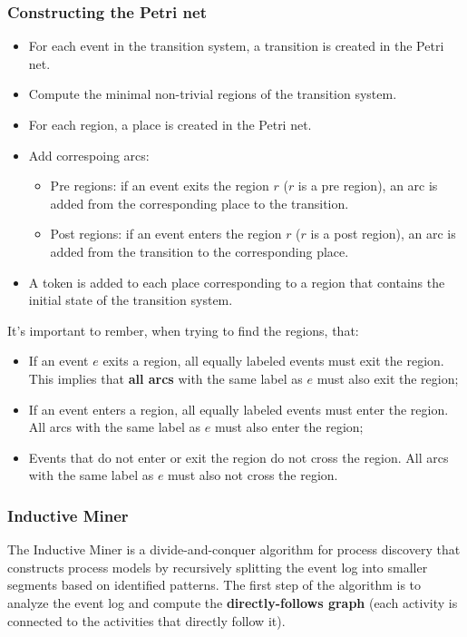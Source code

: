 \subsubsection*{Constructing the Petri net}
\begin{itemize}
    \item For each event in the transition system, a transition is created in the Petri net.
    \item Compute the minimal non-trivial regions of the transition system.
    \item For each region, a place is created in the Petri net.
    \item Add correspoing arcs:
    \begin{itemize}
        \item Pre regions: if an event exits the region $r$ ($r$ is a pre region), an arc is added from the corresponding place to the transition.
        \item Post regions: if an event enters the region $r$ ($r$ is a post region), an arc is added from the transition to the corresponding place.
    \end{itemize}
    \item A token is added to each place corresponding to a region that contains the initial state of the transition system.
\end{itemize}
It's important to rember, when trying to find the regions, that:
\begin{itemize}
    \item If an event $e$ exits a region, all equally labeled events must exit the region. 
    This implies that \textbf{all arcs} with the same label as $e$ must also exit the region;
    \item If an event enters a region, all equally labeled events must enter the region.
    All arcs with the same label as $e$ must also enter the region;
    \item Events that do not enter or exit the region do not cross the region.
    All arcs with the same label as $e$ must also not cross the region.
\end{itemize}

\subsubsection{Inductive Miner}
The Inductive Miner is a divide-and-conquer algorithm for process discovery that constructs process models by recursively splitting the event log into smaller segments based on identified patterns.
The first step of the algorithm is to analyze the event log and compute the \textbf{directly-follows graph} (each activity is connected to the activities that directly follow it).

